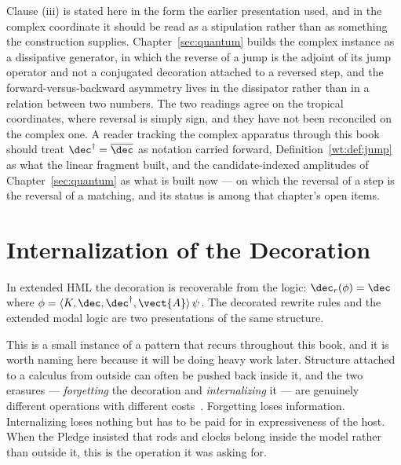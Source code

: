 \begin{remark}
\label{rmk:reversal-status}
Clause (iii) is stated here in the form the earlier presentation used, and
in the complex coordinate it should be read as a stipulation rather than
as something the construction supplies.  Chapter~\ref{sec:quantum} builds
the complex instance as a dissipative generator, in which the reverse of a
jump is the adjoint of its jump operator and not a conjugated decoration
attached to a reversed step, and the forward-versus-backward asymmetry
lives in the dissipator rather than in a relation between two numbers.
The two readings agree on the tropical coordinates, where reversal is
simply sign, and they have not been reconciled on the complex one.  A
reader tracking the complex apparatus through this book should treat
$\dec^{\dagger} = \overline{\dec}$ as notation carried forward,
Definition~\ref{wt:def:jump} as what the linear fragment built, and the
candidate-indexed amplitudes of Chapter~\ref{sec:quantum} as what is
built now --- on which the reversal of a step is the reversal of a
matching, and its status is among that chapter's open items.
\end{remark}

\section{Internalization of the Decoration}

\begin{proposition}
In extended HML the decoration is recoverable from the logic:
$\dec_r(\phi) = \dec$ where
$\phi = \langle K, \dec, \dec^{\dagger}, \vect{A}\rangle\,\psi$.  The
decorated rewrite rules and the extended modal logic are two presentations
of the same structure.
\end{proposition}

This is a small instance of a pattern that recurs throughout this book,
and it is worth naming here because it will be doing heavy work later.
Structure attached to a calculus from outside can often be pushed back
inside it, and the two erasures --- \emph{forgetting} the decoration and
\emph{internalizing} it --- are genuinely different operations with
different costs~\cite{TwoErasures}.  Forgetting loses information.
Internalizing loses nothing but has to be paid for in expressiveness of
the host.  When the Pledge insisted that rods and clocks belong inside the
model rather than outside it, this is the operation it was asking for.

